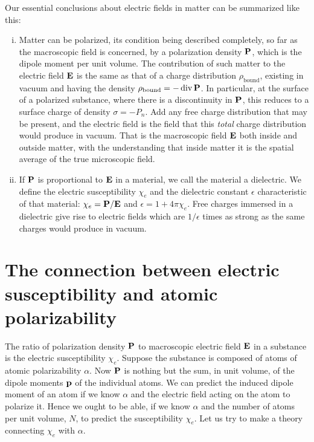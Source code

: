Our essential conclusions about electric fields in matter can be
summarized like this:

\begin{enumerate}[(i)]
\item Matter can be polarized, its condition being described 
completely, so far as the macroscopic field is concerned, by a
polarization density $\mathbf{P}$, which is the dipole moment per unit
volume. The contribution of such matter to the electric
field $\mathbf{E}$ is the same as that of a charge distribution $\rho_\text{bound}$,
existing in vacuum and having the density $\rho_\text{bound} =  - \operatorname{div}\mathbf{P}$.
In particular, at the surface of a polarized substance, where
there is a discontinuity in $\mathbf{P}$, this reduces to a surface charge
of density $\sigma =  -P_n$. Add any free charge distribution that
may be present, and the electric field is the field that this
\emph{total} charge distribution would produce in vacuum. That
is the macroscopic field $\mathbf{E}$ both inside and outside matter,
with the understanding that inside matter it is the spatial
average of the true microscopic field.

\item If $\mathbf{P}$ is proportional to $\mathbf{E}$ in a material, we call the material
a dielectric. We define the electric susceptibility $\chi_e$ and the
dielectric constant $\epsilon$ characteristic of that material:
$\chi_e=\mathbf{P}/\mathbf{E}$ and $\epsilon = 1+4\pi\chi_e$. Free charges immersed in
a dielectric give rise to electric fields which are $1/\epsilon$ times
as strong as the same charges would produce in vacuum.
\end{enumerate}

\section[Susceptibility and atomic polarizability]{The connection between electric susceptibility and atomic polarizability}

The ratio of polarization density $\mathbf{P}$ to macroscopic electric field $\mathbf{E}$
in a substance is the electric susceptibility $\chi_e$. Suppose the substance
is composed of atoms of atomic polarizability $\alpha$. Now $\mathbf{P}$ is nothing
but the sum, in unit volume, of the dipole moments $\mathbf{p}$ of the individual
atoms. We can predict the induced dipole moment of an atom if
we know $\alpha$ and the electric field acting on the atom to polarize it.
Hence we ought to be able, if we know $\alpha$ and the number of atoms
per unit volume, $N$, to predict the susceptibility $\chi_e$. Let us try to
make a theory connecting $\chi_e$ with $\alpha$.

